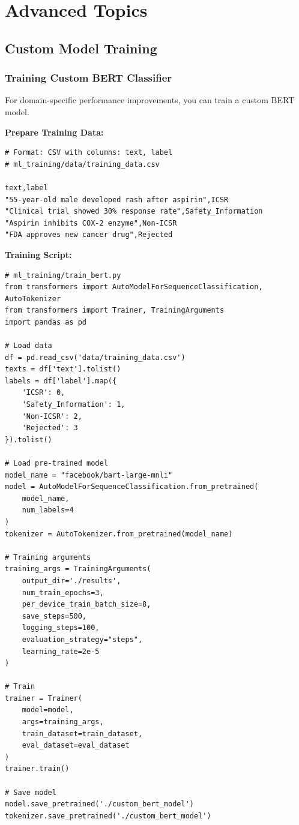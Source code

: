 
\chapter{Advanced Topics}

\section{Custom Model Training}

\subsection{Training Custom BERT Classifier}

For domain-specific performance improvements, you can train a custom BERT model.

\textbf{Prepare Training Data:}
\begin{lstlisting}[style=pythonstyle]
# Format: CSV with columns: text, label
# ml_training/data/training_data.csv

text,label
"55-year-old male developed rash after aspirin",ICSR
"Clinical trial showed 30% response rate",Safety_Information
"Aspirin inhibits COX-2 enzyme",Non-ICSR
"FDA approves new cancer drug",Rejected
\end{lstlisting}

\textbf{Training Script:}
\begin{lstlisting}[style=pythonstyle]
# ml_training/train_bert.py
from transformers import AutoModelForSequenceClassification, AutoTokenizer
from transformers import Trainer, TrainingArguments
import pandas as pd

# Load data
df = pd.read_csv('data/training_data.csv')
texts = df['text'].tolist()
labels = df['label'].map({
    'ICSR': 0,
    'Safety_Information': 1,
    'Non-ICSR': 2,
    'Rejected': 3
}).tolist()

# Load pre-trained model
model_name = "facebook/bart-large-mnli"
model = AutoModelForSequenceClassification.from_pretrained(
    model_name,
    num_labels=4
)
tokenizer = AutoTokenizer.from_pretrained(model_name)

# Training arguments
training_args = TrainingArguments(
    output_dir='./results',
    num_train_epochs=3,
    per_device_train_batch_size=8,
    save_steps=500,
    logging_steps=100,
    evaluation_strategy="steps",
    learning_rate=2e-5
)

# Train
trainer = Trainer(
    model=model,
    args=training_args,
    train_dataset=train_dataset,
    eval_dataset=eval_dataset
)
trainer.train()

# Save model
model.save_pretrained('./custom_bert_model')
tokenizer.save_pretrained('./custom_bert_model')
\end{lstlisting}

